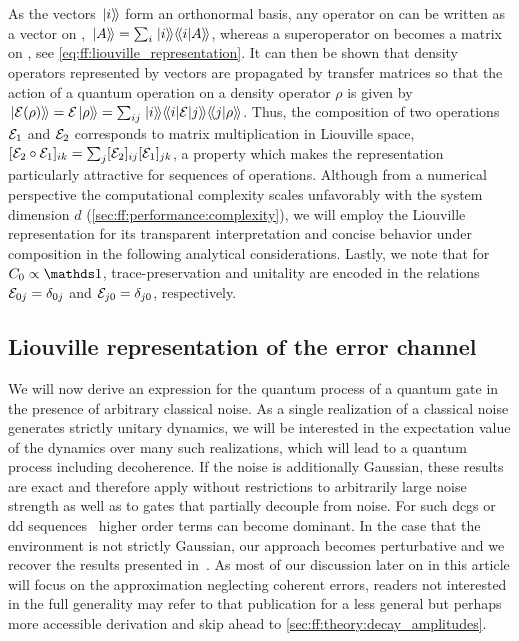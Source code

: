 As the vectors $\mbox{\ensuremath{\left.\ket{i}\!\right\rangle}}$ form an orthonormal basis, any operator on \Hspace can be written as a vector on \Lspace, $\mbox{\ensuremath{\left.\ket{A}\!\right\rangle}} = \sum_i\mbox{\ensuremath{\left.\ket{i}\!\right\rangle}}\mbox{\ensuremath{\left\langle\!\braket{i}{A}\!\right\rangle}}$, whereas a superoperator on \Hspace becomes a matrix on \Lspace, see \cref{eq:ff:liouville_representation}.
It can then be shown that density operators represented by vectors are propagated by transfer matrices so that the action of a quantum operation \qp on a density operator $\rho$ is given by $\dket{\qp(\rho)} = \qp\dket{\rho} = \sum_{ij}\dket{i}\dmel{i}{\qp}{j}\dip{j}{\rho}$.
Thus, the composition of two operations $\mathcal{E}_1$ and $\mathcal{E}_2$ corresponds to matrix multiplication in Liouville space, $[\mathcal{E}_2\circ\mathcal{E}_1]_{ik} = \sum_j[\mathcal{E}_2]_{ij}[\mathcal{E}_1]_{jk}$, a property which makes the representation particularly attractive for sequences of operations.
Although from a numerical perspective the computational complexity scales unfavorably with the system dimension $d$ (\cf \cref{sec:ff:performance:complexity}),  we will employ the Liouville representation for its transparent interpretation and concise behavior under composition in the following analytical considerations.
Lastly, we note that for $C_0\propto\eye$, trace-preservation and unitality are encoded in the relations $\mathcal{E}_{0j} = \delta_{0j}$ and $\mathcal{E}_{j0} = \delta_{j0}$, respectively.

\subsection{Liouville representation of the error channel}\label{sec:ff:theory:transfer_matrix:derivation}
We will now derive an expression for the quantum process of a quantum gate in the presence of arbitrary classical noise.
As a single realization of a classical noise generates strictly unitary dynamics, we will be interested in the expectation value of the dynamics over many such realizations, which will lead to a quantum process including decoherence.
If the noise is additionally Gaussian, these results are exact and therefore apply without restrictions to arbitrarily large noise strength as well as to gates that partially decouple from noise.
For such \glspl{dcg} or \gls{dd} sequences~\cite{Khodjasteh2009,Cywinski2008} higher order terms can become dominant.
In the case that the environment is not strictly Gaussian, our approach becomes perturbative and we recover the results presented in~.
As most of our discussion later on in this article will focus on the approximation neglecting coherent errors, readers not interested in the full generality may refer to that publication for a less general but perhaps more accessible derivation and skip ahead to \cref{sec:ff:theory:decay_amplitudes}.

